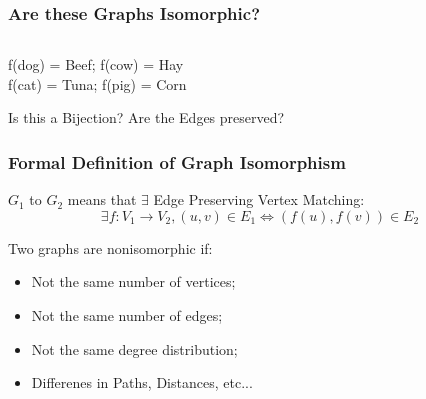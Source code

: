 \documentclass{beamer}
\begin{document}
\begin{frame}
  \frametitle{Are these Graphs Isomorphic?}

    {\larger
    \begin{columns}
    \end{columns}

    \bigskip
    f(dog) = Beef; \hspace{2cm} f(cow) = Hay\\
    f(cat) = Tuna; \hspace{2cm} f(pig) = Corn

    \bigskip

    Is this a Bijection? Are the Edges preserved?
    }
\end{frame}

\begin{frame}
  \frametitle{Formal Definition of Graph Isomorphism}

  {\larger
    $G_1$  to $G_2$ means that $\exists$
    Edge Preserving Vertex Matching:
    \begin{equation}
      \exists f:V_1 \rightarrow V_2, 
      (u,v) \in E_1 \iff (f(u),f(v)) \in E_2
    \end{equation}

    \bigskip

    Two graphs are \alert{non}isomorphic if:
    \begin{itemize}
    \item Not the same number of vertices;
    \item Not the same number of edges;
    \item Not the same degree distribution;
    \item Differenes in Paths, Distances, etc...
    \end{itemize}
  }
\end{frame}
\end{document}
